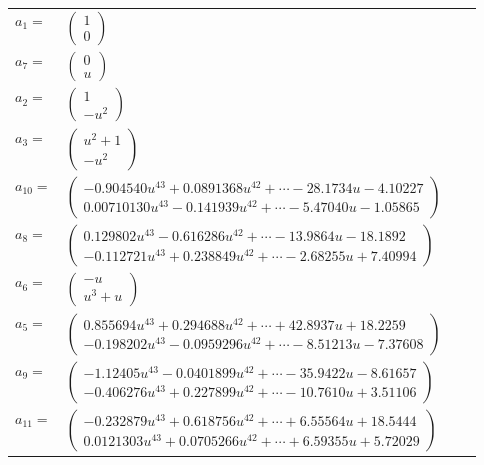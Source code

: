 \documentclass[1p]{elsarticle_modified}
\theoremstyle{definition}
\begin{document}
\begin{tabular}{m{7pt} m{180pt} m{7pt} m{180pt} }
\flushright $a_{1}=$&$\begin{pmatrix}1\\0\end{pmatrix}$ \\
\flushright $a_{7}=$&$\begin{pmatrix}0\\u\end{pmatrix}$ \\
\flushright $a_{2}=$&$\begin{pmatrix}1\\- u^2\end{pmatrix}$ \\
\flushright $a_{3}=$&$\begin{pmatrix}u^2+1\\- u^2\end{pmatrix}$ \\
\flushright $a_{10}=$&$\begin{pmatrix}-0.904540 u^{43}+0.0891368 u^{42}+\cdots-28.1734 u-4.10227\\0.00710130 u^{43}-0.141939 u^{42}+\cdots-5.47040 u-1.05865\end{pmatrix}$ \\
\flushright $a_{8}=$&$\begin{pmatrix}0.129802 u^{43}-0.616286 u^{42}+\cdots-13.9864 u-18.1892\\-0.112721 u^{43}+0.238849 u^{42}+\cdots-2.68255 u+7.40994\end{pmatrix}$ \\
\flushright $a_{6}=$&$\begin{pmatrix}- u\\u^3+u\end{pmatrix}$ \\
\flushright $a_{5}=$&$\begin{pmatrix}0.855694 u^{43}+0.294688 u^{42}+\cdots+42.8937 u+18.2259\\-0.198202 u^{43}-0.0959296 u^{42}+\cdots-8.51213 u-7.37608\end{pmatrix}$ \\
\flushright $a_{9}=$&$\begin{pmatrix}-1.12405 u^{43}-0.0401899 u^{42}+\cdots-35.9422 u-8.61657\\-0.406276 u^{43}+0.227899 u^{42}+\cdots-10.7610 u+3.51106\end{pmatrix}$ \\
\flushright $a_{11}=$&$\begin{pmatrix}-0.232879 u^{43}+0.618756 u^{42}+\cdots+6.55564 u+18.5444\\0.0121303 u^{43}+0.0705266 u^{42}+\cdots+6.59355 u+5.72029\end{pmatrix}$ \\

\end{tabular}
\end{document}
